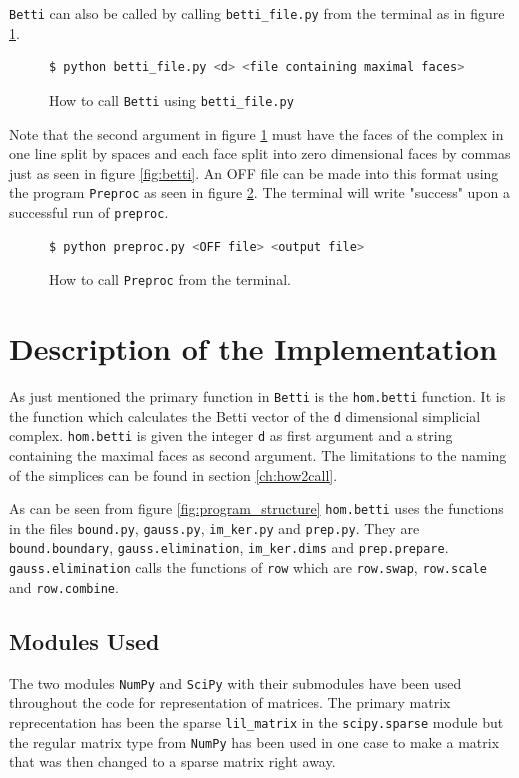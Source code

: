 \documentclass[11pt,a4paper,twoside, openright]{report}
\begin{document}
\texttt{Betti} can also be called by calling \texttt{betti\_file.py} from the terminal as in figure \ref{fig:bettifile}.
\begin{figure}[H]
\begin{lstlisting}[language=bash]
$ python betti_file.py <d> <file containing maximal faces> 
\end{lstlisting}
\caption{How to call \texttt{Betti} using \texttt{betti\_file.py}}
\label{fig:bettifile}
\end{figure}
Note that the second argument in figure \ref{fig:bettifile} must have the faces of the complex in one line split by spaces and each face split into zero dimensional faces by commas just as seen in figure \ref{fig:betti}. An OFF file can be made into this format using the program \texttt{Preproc} as seen in figure \ref{fig:preproc}. The terminal will write "success" upon a successful run of \texttt{preproc}.

\begin{figure}[H]
\begin{lstlisting}[language=bash]
$ python preproc.py <OFF file> <output file> 
\end{lstlisting}
\caption{How to call \texttt{Preproc} from the terminal.}
\label{fig:preproc}
\end{figure}

\section{Description of the Implementation}
As just mentioned the primary function in \texttt{Betti} is the \texttt{hom.betti} function. It is the function which calculates the Betti vector of the \texttt{d} dimensional simplicial complex. \texttt{hom.betti} is given the integer \texttt{d} as first argument and a string containing the maximal faces as second argument. The limitations to the naming of the simplices can be found in section \ref{ch:how2call}. 

As can be seen from figure \ref{fig:program_structure} \texttt{hom.betti} uses the functions in the files \texttt{bound.py}, \texttt{gauss.py}, \texttt{im\_ker.py} and \texttt{prep.py}. They are \texttt{bound.boundary}, \texttt{gauss.elimination}, \texttt{im\_ker.dims} and \texttt{prep.prepare}. \texttt{gauss.elimination} calls the functions of \texttt{row} which are \texttt{row.swap}, \texttt{row.scale} and \texttt{row.combine}.

\subsection{Modules Used}
The two modules \texttt{NumPy} and \texttt{SciPy} with their submodules have been used throughout the code for representation of matrices. The primary matrix reprecentation has been the sparse \texttt{lil\_matrix} in the \texttt{scipy.sparse} module but the regular matrix type from \texttt{NumPy} has been used in one case to make a matrix that was then changed to a sparse matrix right away. 
\end{document}
